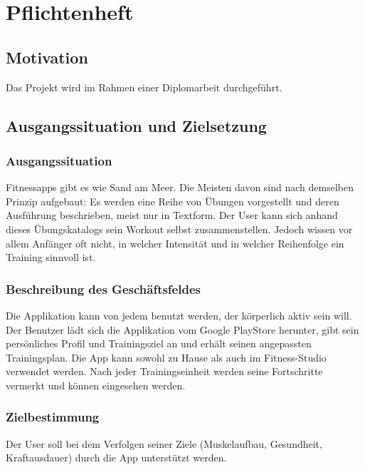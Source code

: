 \documentclass[FIPLY_base.tex]{subfiles}
\begin{document}
	\section{Pflichtenheft}
	
	\subsection{Motivation}
	Das Projekt wird im Rahmen einer Diplomarbeit durchgeführt.
	\subsection{Ausgangssituation und Zielsetzung}
	\subsubsection{Ausgangssituation}
	Fitnessapps gibt es wie Sand am Meer. Die Meisten davon sind nach demselben Prinzip aufgebaut: Es werden eine Reihe von Übungen vorgestellt und deren Ausführung beschrieben, meist nur in Textform. Der User kann sich anhand dieses Übungskatalogs sein Workout selbst zusammenstellen. Jedoch wissen vor allem Anfänger oft nicht, in welcher Intensität und in welcher Reihenfolge ein Training sinnvoll ist. 
	\subsubsection{Beschreibung des Geschäftsfeldes}
	Die Applikation kann von jedem benutzt werden, der körperlich aktiv sein will. Der Benutzer lädt sich die Applikation vom Google PlayStore herunter, gibt sein persönliches Profil und Trainingsziel an und erhält seinen angepassten Trainingsplan. Die App kann sowohl zu Hause als auch im Fitness-Studio verwendet werden. Nach jeder Trainingseinheit werden seine Fortschritte vermerkt und können eingesehen werden.
	
	\subsubsection{Zielbestimmung}
	Der User soll bei dem Verfolgen seiner Ziele (Muskelaufbau, Gesundheit, Kraftausdauer) durch die App unterstützt werden.
	
\end{document}
